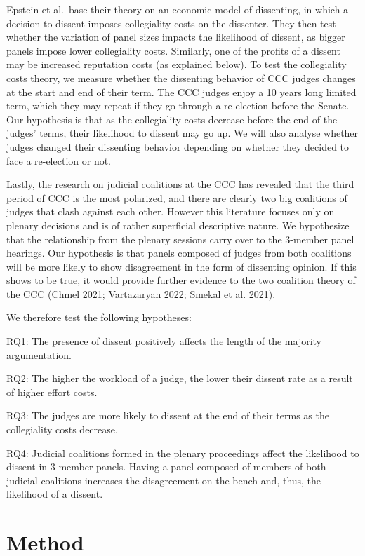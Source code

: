\documentclass[
  11pt,
]{article}
\begin{document}
Epstein et al.~base their theory on an economic model of dissenting, in
which a decision to dissent imposes collegiality costs on the dissenter.
They then test whether the variation of panel sizes impacts the
likelihood of dissent, as bigger panels impose lower collegiality costs.
Similarly, one of the profits of a dissent may be increased reputation
costs (as explained below). To test the collegiality costs theory, we
measure whether the dissenting behavior of CCC judges changes at the
start and end of their term. The CCC judges enjoy a 10 years long
limited term, which they may repeat if they go through a re-election
before the Senate. Our hypothesis is that as the collegiality costs
decrease before the end of the judges' terms, their likelihood to
dissent may go up. We will also analyse whether judges changed their
dissenting behavior depending on whether they decided to face a
re-election or not.

Lastly, the research on judicial coalitions at the CCC has revealed that
the third period of CCC is the most polarized, and there are clearly two
big coalitions of judges that clash against each other. However this
literature focuses only on plenary decisions and is of rather
superficial descriptive nature. We hypothesize that the relationship
from the plenary sessions carry over to the 3-member panel hearings. Our
hypothesis is that panels composed of judges from both coalitions will
be more likely to show disagreement in the form of dissenting opinion.
If this shows to be true, it would provide further evidence to the two
coalition theory of the CCC (Chmel 2021; Vartazaryan 2022; Smekal et al.
2021).

We therefore test the following hypotheses:

RQ1: The presence of dissent positively affects the length of the
majority argumentation.

RQ2: The higher the workload of a judge, the lower their dissent rate as
a result of higher effort costs.

RQ3: The judges are more likely to dissent at the end of their terms as
the collegiality costs decrease.

RQ4: Judicial coalitions formed in the plenary proceedings affect the
likelihood to dissent in 3-member panels. Having a panel composed of
members of both judicial coalitions increases the disagreement on the
bench and, thus, the likelihood of a dissent.

\hypertarget{method}{%
\section{Method}\label{method}}
\end{document}
